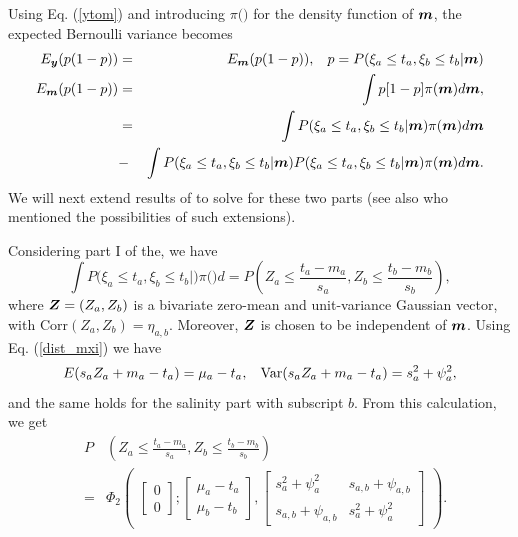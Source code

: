 \documentclass[aoas]{imsart}
\begin{document}
Using Eq. (\ref{ytom}) and
introducing $\pi(\bm)$ for the density function of ${\boldsymbol m}$, the expected Bernoulli variance becomes
\begin{eqnarray}\label{eq:var2}
E_{\by}(p(1-p)) &=& E_{\bm}(p(1-p)), \hspace{3mm} p=P(\xi_a \leq t_a, \xi_b \leq t_b|\bm) \nonumber \\
E_{\bm}(p(1-p)) & = & \int p[1-p] \pi(\bm) d\bm, \nonumber \\
 &=& \int P(\xi_a \leq t_a, \xi_b \leq t_b|\bm)  \pi(\bm) d\bm \nonumber  \\
&-& \int P(\xi_a \leq t_a, \xi_b \leq t_b|\bm) P(\xi_a \leq t_a, \xi_b \leq t_b|\bm) \pi(\bm) d\bm. 
\end{eqnarray}
We will next extend results of \cite{chevalier2014fast} to solve for these two parts (see also \cite{stroh} who mentioned the possibilities of such extensions). 

Considering part I of the, we have
\begin{equation}\label{part1:phi2}
 \int P(\xi_a \leq t_a, \xi_b \leq t_b|\bm) \pi(\bm) d\bm= 
P \left( Z_{a} \leq \frac{t_a-m_{a}}{s_{a}}, 
Z_{b} \leq \frac{t_b-m_{b}}{s_{b}} \right), \nonumber
\end{equation}
where ${\boldsymbol Z}=(Z_{a},Z_{b})$ is a bivariate zero-mean and unit-variance Gaussian vector, with $\mbox{Corr}(Z_{a},Z_{b})=\eta_{a,b}$. Moreover, ${\boldsymbol Z}$ is chosen to be independent of ${\boldsymbol m}$. Using Eq. (\ref{dist_mxi}) we have
\begin{equation}
    E(s_{a} Z_{a}+m_{a}-t_a) = \mu_{a}-t_a, \hspace{3mm}
    \mbox{Var}(s_{a} Z_{a}+m_{a}-t_a) = s^2_a+ \psi^2_{a}, 
\end{equation}
and the same holds for the salinity part with subscript $b$. From this calculation, we get
\begin{eqnarray}\label{two_parts0}
& P & \left( Z_{a} \leq \frac{t_a-m_{a}}{s_{a}}, 
Z_{b} \leq \frac{t_b-m_{b}}{s_{b}} \right) \\
&=& \Phi_2 \begin{pmatrix} 
\begin{bmatrix} 0\\
0
\end{bmatrix};
\begin{bmatrix} \mu_{a}-t_a\\
\mu_{b}-t_b
\end{bmatrix},\begin{bmatrix}
s^2_a+ \psi^2_{a} & s_{a,b}+\psi_{a,b}  \\
s_{a,b}+\psi_{a,b}   & s^2_a+ \psi^2_{a} 
\end{bmatrix}\end{pmatrix} \nonumber.
\end{eqnarray}
\end{document}
